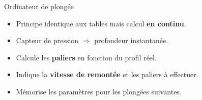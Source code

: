 \begin{frame}{Ordinateur de plongée}
  \begin{itemize}
    \item Principe identique aux tables mais calcul \textbf{en continu}.
    \item Capteur de pression $\Rightarrow$ profondeur instantanée.
    \item Calcule les \textbf{paliers} en fonction du profil réel.
    \item Indique la \textbf{vitesse de remontée} et les paliers à effectuer.
    \item Mémorise les paramètres pour les plongées suivantes.
  \end{itemize}
\end{frame}
